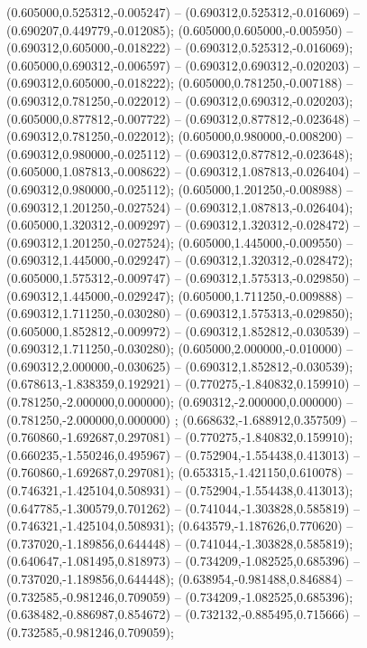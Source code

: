  (0.605000,0.525312,-0.005247) -- (0.690312,0.525312,-0.016069) -- (0.690207,0.449779,-0.012085);
 (0.605000,0.605000,-0.005950) -- (0.690312,0.605000,-0.018222) -- (0.690312,0.525312,-0.016069);
 (0.605000,0.690312,-0.006597) -- (0.690312,0.690312,-0.020203) -- (0.690312,0.605000,-0.018222);
 (0.605000,0.781250,-0.007188) -- (0.690312,0.781250,-0.022012) -- (0.690312,0.690312,-0.020203);
 (0.605000,0.877812,-0.007722) -- (0.690312,0.877812,-0.023648) -- (0.690312,0.781250,-0.022012);
 (0.605000,0.980000,-0.008200) -- (0.690312,0.980000,-0.025112) -- (0.690312,0.877812,-0.023648);
 (0.605000,1.087813,-0.008622) -- (0.690312,1.087813,-0.026404) -- (0.690312,0.980000,-0.025112);
 (0.605000,1.201250,-0.008988) -- (0.690312,1.201250,-0.027524) -- (0.690312,1.087813,-0.026404);
 (0.605000,1.320312,-0.009297) -- (0.690312,1.320312,-0.028472) -- (0.690312,1.201250,-0.027524);
 (0.605000,1.445000,-0.009550) -- (0.690312,1.445000,-0.029247) -- (0.690312,1.320312,-0.028472);
 (0.605000,1.575312,-0.009747) -- (0.690312,1.575313,-0.029850) -- (0.690312,1.445000,-0.029247);
 (0.605000,1.711250,-0.009888) -- (0.690312,1.711250,-0.030280) -- (0.690312,1.575313,-0.029850);
 (0.605000,1.852812,-0.009972) -- (0.690312,1.852812,-0.030539) -- (0.690312,1.711250,-0.030280);
 (0.605000,2.000000,-0.010000) -- (0.690312,2.000000,-0.030625) -- (0.690312,1.852812,-0.030539);
 (0.678613,-1.838359,0.192921) -- (0.770275,-1.840832,0.159910) -- (0.781250,-2.000000,0.000000);
 (0.690312,-2.000000,0.000000) -- (0.781250,-2.000000,0.000000) ;
 (0.668632,-1.688912,0.357509) -- (0.760860,-1.692687,0.297081) -- (0.770275,-1.840832,0.159910);
 (0.660235,-1.550246,0.495967) -- (0.752904,-1.554438,0.413013) -- (0.760860,-1.692687,0.297081);
 (0.653315,-1.421150,0.610078) -- (0.746321,-1.425104,0.508931) -- (0.752904,-1.554438,0.413013);
 (0.647785,-1.300579,0.701262) -- (0.741044,-1.303828,0.585819) -- (0.746321,-1.425104,0.508931);
 (0.643579,-1.187626,0.770620) -- (0.737020,-1.189856,0.644448) -- (0.741044,-1.303828,0.585819);
 (0.640647,-1.081495,0.818973) -- (0.734209,-1.082525,0.685396) -- (0.737020,-1.189856,0.644448);
 (0.638954,-0.981488,0.846884) -- (0.732585,-0.981246,0.709059) -- (0.734209,-1.082525,0.685396);
 (0.638482,-0.886987,0.854672) -- (0.732132,-0.885495,0.715666) -- (0.732585,-0.981246,0.709059);
